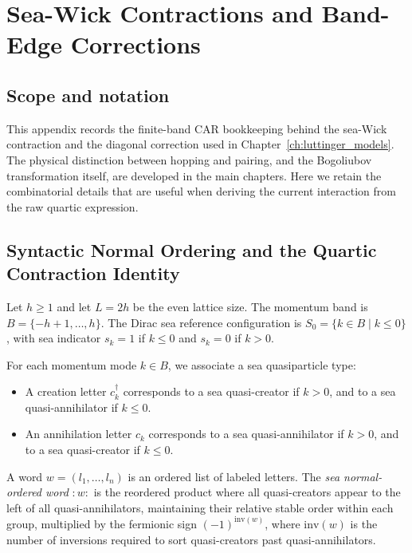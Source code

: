 \chapter{Sea-Wick Contractions and Band-Edge Corrections}
\label{app:interactions_bogoliubov}

\section{Scope and notation}

This appendix records the finite-band CAR bookkeeping behind the sea-Wick contraction and the diagonal correction used in Chapter~\ref{ch:luttinger_models}. The physical distinction between hopping and pairing, and the Bogoliubov transformation itself, are developed in the main chapters. Here we retain the combinatorial details that are useful when deriving the current interaction from the raw quartic expression.

\section{Syntactic Normal Ordering and the Quartic Contraction Identity}

Let $h \ge 1$ and let $L = 2h$ be the even lattice size. The momentum band is $B = \{-h+1, \dots, h\}$. The Dirac sea reference configuration is $S_0 = \{k \in B \mid k \le 0\}$, with sea indicator $s_k = 1$ if $k \le 0$ and $s_k = 0$ if $k > 0$.

\begin{definition}
For each momentum mode $k \in B$, we associate a sea quasiparticle type:
\begin{itemize}
    \item A creation letter $c_k^\dagger$ corresponds to a sea quasi-creator if $k > 0$, and to a sea quasi-annihilator if $k \le 0$.
    \item An annihilation letter $c_k$ corresponds to a sea quasi-annihilator if $k > 0$, and to a sea quasi-creator if $k \le 0$.
\end{itemize}
A word $w = (l_1, \dots, l_n)$ is an ordered list of labeled letters. The \emph{sea normal-ordered word} $:w:$ is the reordered product where all quasi-creators appear to the left of all quasi-annihilators, maintaining their relative stable order within each group, multiplied by the fermionic sign $(-1)^{\mathrm{inv}(w)}$, where $\mathrm{inv}(w)$ is the number of inversions required to sort quasi-creators past quasi-annihilators.
\end{definition}

